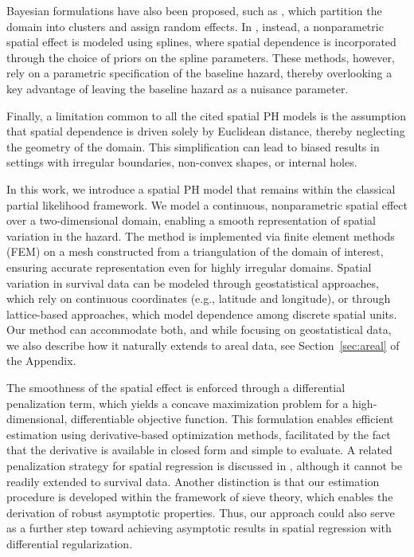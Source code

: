 \documentclass[11pt]{article}
\begin{document}
Bayesian formulations have also been proposed, such as \cite{banerjee2003frailty,taylor2017}, which partition the domain into clusters and assign random effects.
In \cite{hennerfeind2003geoadditive}, instead, a nonparametric spatial effect is modeled using splines, where spatial dependence is incorporated through the choice of priors on the spline parameters. These methods, however, rely on a parametric specification of the baseline hazard, thereby overlooking a key advantage of leaving the baseline hazard as a nuisance parameter. 


Finally, a limitation common to all the cited spatial PH models is the assumption that spatial dependence is driven solely by Euclidean distance, thereby neglecting the geometry of the domain. This simplification can lead to biased results in settings with irregular boundaries, non-convex shapes, or internal holes.  




In this work, we introduce a spatial PH model that remains within the classical partial likelihood framework. We model a continuous, nonparametric spatial effect over a two-dimensional domain, enabling a smooth representation of spatial variation in the hazard. The method is implemented via finite element methods (FEM) on a mesh constructed from a triangulation of the domain of interest, ensuring accurate representation even for highly irregular domains. Spatial variation in survival data can be modeled through geostatistical approaches, which rely on continuous coordinates (e.g., latitude and longitude), or through lattice-based approaches, which model dependence among discrete spatial units. Our method can accommodate both, and while focusing on geostatistical data, we also describe how it naturally extends to areal data, see Section~\ref{sec:areal} of the Appendix.  

The smoothness of the spatial effect is enforced through a differential penalization term, which yields a concave maximization problem for a high-dimensional, differentiable objective function. This formulation enables efficient estimation using derivative-based optimization methods, facilitated by the fact that the derivative is available in closed form and simple to evaluate. A related penalization strategy for spatial regression is discussed in \cite{sangalli2013spatial}, although it cannot be readily extended to survival data. %
Another distinction is that our estimation procedure is developed within the framework of sieve theory, which enables the derivation of robust asymptotic properties. Thus, our approach could also serve as a further step toward achieving asymptotic results in spatial regression with differential regularization.
\end{document}
